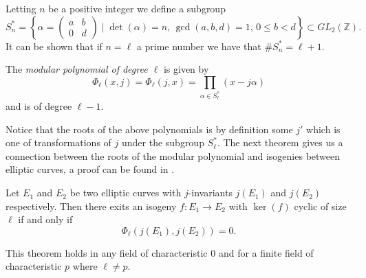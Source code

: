 Letting $n$ be a positive integer we define a subgroup
$$ S_n^* = \left\{ \alpha = \begin{pmatrix} a & b \\ 0 & d \end{pmatrix} \mid \det(\alpha)=n,\, \gcd(a,b,d)=1,\, 0 \leq b < d \right\} \subset GL_2(\mathbb{Z}). $$
It can be shown that if $n = \ell$ a prime number we have that $\#S_n^* = \ell + 1$.

\begin{mydef}
 The \emph{modular polynomial of degree $\ell$} is given by
$$\Phi_\ell(x,j) = \Phi_\ell(j,x) = \prod_{\alpha \in S_\ell^*}(x - j \alpha) $$
and is of degree $\ell-1$.
\end{mydef}
Notice that the roots of the above polynomials is by definition some $j'$ which is one of transformations
of $j$ under the subgroup $S_\ell^*$. The next theorem gives us a connection between the roots of the
modular polynomial and isogenies between elliptic curves, a proof can be found in \cite{Lang2}.

\begin{thm} \label{modpol}
 Let $E_1$ and $E_2$ be two elliptic curves with $j$-invariants $j(E_1)$ and $j(E_2)$ respectively.
Then there exits an isogeny $f: E_1 \rightarrow E_2$ with $\ker(f)$ cyclic of size $\ell$ if and only if
$$\Phi_\ell(j(E_1), j(E_2)) = 0. $$
\end{thm}

This theorem holds in any field of characteristic $0$ and for a finite field of characteristic $p$ where
$\ell \neq p$.

